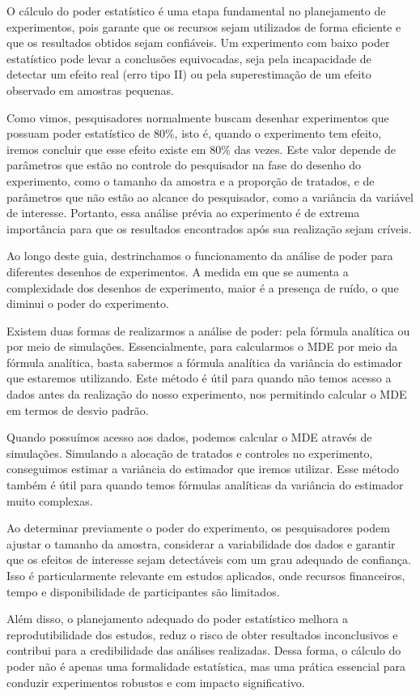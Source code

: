 
O cálculo do poder estatístico é uma etapa fundamental no planejamento de experimentos, pois garante que os recursos sejam utilizados de forma eficiente e que os resultados obtidos sejam confiáveis. Um experimento com baixo poder estatístico pode levar a conclusões equivocadas, seja pela incapacidade de detectar um efeito real (erro tipo II) ou pela superestimação de um efeito observado em amostras pequenas.

Como vimos, pesquisadores normalmente buscam desenhar experimentos que possuam poder estatístico de 80\%, isto é, quando o experimento tem efeito, iremos concluir que esse efeito existe em 80\% das vezes. Este valor depende de parâmetros que estão no controle do pesquisador na fase do desenho do experimento, como o tamanho da amostra e a proporção de tratados, e de parâmetros que não estão ao alcance do pesquisador, como a variância da variável de interesse. Portanto, essa análise prévia ao experimento é de extrema importância para que os resultados encontrados após sua realização sejam críveis.


Ao longo deste guia, destrinchamos o funcionamento da análise de poder para diferentes desenhos de experimentos. A medida em que se aumenta a complexidade dos desenhos de experimento, maior é a presença de ruído, o que diminui o poder do experimento. 


Existem duas formas de realizarmos a análise de poder: pela fórmula analítica ou por meio de simulações. Essencialmente, para calcularmos o MDE por meio da fórmula analítica, basta sabermos a fórmula analítica da variância do estimador que estaremos utilizando. Este método é útil para quando não temos acesso a dados antes da realização do nosso experimento, nos permitindo calcular o MDE em termos de desvio padrão.


Quando possuímos acesso aos dados, podemos calcular o MDE através de simulações. Simulando a alocação de tratados e controles no experimento, conseguimos estimar a variância do estimador que iremos utilizar. Esse método também é útil para quando temos fórmulas analíticas da variância do estimador muito complexas.

Ao determinar previamente o poder do experimento, os pesquisadores podem ajustar o tamanho da amostra, considerar a variabilidade dos dados e garantir que os efeitos de interesse sejam detectáveis com um grau adequado de confiança. Isso é particularmente relevante em estudos aplicados, onde recursos financeiros, tempo e disponibilidade de participantes são limitados.

Além disso, o planejamento adequado do poder estatístico melhora a reprodutibilidade dos estudos, reduz o risco de obter resultados inconclusivos e contribui para a credibilidade das análises realizadas. Dessa forma, o cálculo do poder não é apenas uma formalidade estatística, mas uma prática essencial para conduzir experimentos robustos e com impacto significativo.